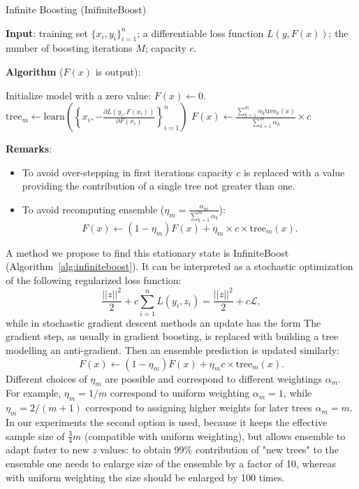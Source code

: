\begin{algorithm}[!h]
  \caption{Infinite Boosting (InifiniteBoost)}\label{alg:infiniteboost}
  {\bf Input}: training set $\{x_i, y_i\}_{i=1}^n$; a differentiable loss function $L(y, F(x))$; the number of boosting iterations $M$; capacity $c$.

  {\bf Algorithm} ($F(x)$ is output):
  \begin{algorithmic}
    \State Initialize model with a zero value: $F(x) \gets 0$.
      \State $\text{tree}_m \gets \text{learn}\left(\left\{x_i, -\frac{\partial L(y_i, F(x_i))}{\partial F(x_i)}\right\}_{i=1}^n\right)$
      \State $F(x) \gets  \frac{\sum_{k=1}^m \alpha_k \text{tree}_k(x)}{\sum_{k=1}^m \alpha_k} \times c$
    \EndFor
  \end{algorithmic}

  {\bf Remarks}:
  \begin{itemize}
    \item To avoid over-stepping in first iterations capacity $c$ is replaced with a value providing the contribution of a single tree not greater than one.
    \item To avoid recomputing ensemble ($\eta_m = \frac{\alpha_m}{\sum_{k=1}^m \alpha_k}$):
      \begin{equation*}
        F(x) \gets (1-\eta_m)F(x) + \eta_m \times c \times \text{tree}_m(x).
      \end{equation*}
  \end{itemize}
\end{algorithm}
A method we propose to find this stationary state is InfiniteBoost (Algorithm~\ref{alg:infiniteboost}).
It can be interpreted as a stochastic optimization of the following regularized loss function:
\begin{equation*}
  \dfrac{|| z ||^2}{2} + c \sum_{i=1}^n L(y_i, z_i) = \dfrac{|| z ||^2}{2} + c \mathcal{L},
\end{equation*}
while in stochastic gradient descent methods an update has the form
The gradient step, as usually in gradient boosting, is replaced with building a tree modelling an anti-gradient.
Then an ensemble prediction is updated similarly:
\begin{equation*}
    F(x) \leftarrow (1 - \eta_m) F(x) + \eta_m c \times \text{tree}_m(x).
\end{equation*}
Different choices of $\eta_m$ are possible and correspond to different weightings $\alpha_m$.
For example, $\eta_m = 1 / m$ correspond to uniform weighting $\alpha_m = 1$,
while $\eta_m = 2 / (m + 1)$ correspond to assigning higher weights for later trees $\alpha_m = m$.
In our experiments the second option is used, because it keeps the effective sample size of $\frac{3}{4}m$ (compatible with uniform weighting),
but allows ensemble to adapt faster to new $z$ values:
to obtain 99\% contribution of "new trees" to the ensemble one needs to enlarge size of the ensemble by a factor of 10,
whereas with uniform weighting the size should be enlarged by 100 times.

